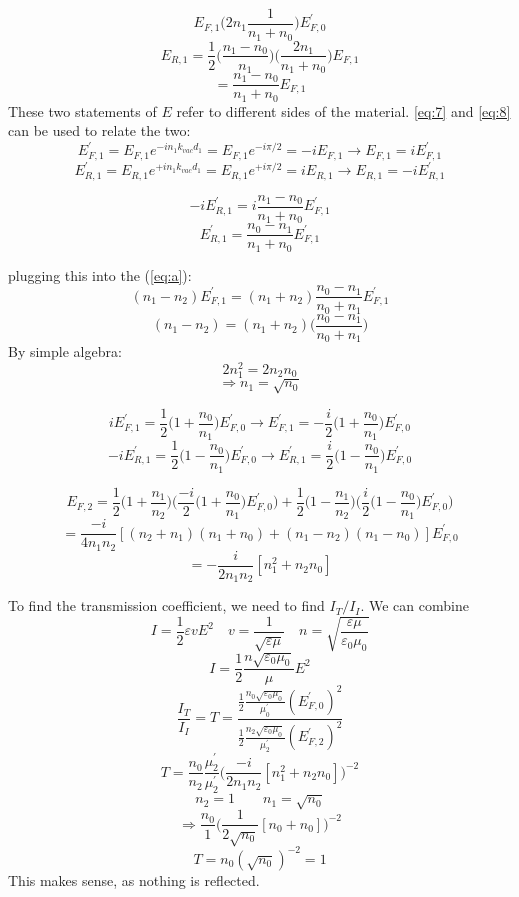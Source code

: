 \documentclass[12pt]{article}
\begin{document}
\begin{enumerate}[label=\alph*)]
\[E_{F,1}\Big(2n_1\frac{1}{n_1+n_0}\Big)E^\prime_{F,0}\]
\[E_{R,1} = \frac{1}{2}\Big(\frac{n_1-n_0}{n_1}\Big)\Big(\frac{2n_1}{n_1+n_0}\Big)E_{F,1}\]
\[= \frac{n_1-n_0}{n_1 +n_0}E_{F,1}\]
These two statements of $E$ refer to different sides of the material. \ref{eq:7} and \ref{eq:8} can be used to relate the two:
\begin{equation}
E^\prime_{F,1} = E_{F,1}e^{-in_1k_{vac}d_1} = E_{F,1}e^{-i\pi/2} = -iE_{F,1} \rightarrow E_{F,1} = i E^\prime_{F,1}
\label{eq:b}
\end{equation}
\begin{equation}
E^\prime_{R,1} = E_{R,1}e^{+in_1k_{vac}d_1} = E_{R,1}e^{+i\pi/2} = iE_{R,1} \rightarrow E_{R,1} = -i E^\prime_{R,1}
\label{eq:c}
\end{equation}
\smallskip

\[-iE^\prime_{R,1} = i \frac{n_1 - n_0}{n_1 + n_0}E^\prime_{F,1}\]
\[E^\prime_{R,1} = \frac{n_0 - n_1}{n_1 + n_0}E^\prime_{F,1}\]

plugging this into the (\ref{eq:a}):
\[(n_1-n_2)E^\prime_{F,1} = (n_1+n_2)\frac{n_0-n_1}{n_0 + n_1}E^\prime_{F,1}\]
\[(n_1 - n_2) = (n_1+n_2)\Big(\frac{n_0-n_1}{n_0+n_1}\Big)\]
By simple algebra:
\[2n_1^2 = 2n_2n_0\]
\[\Longrightarrow \boxed{n_1 = \sqrt{n_0}}\]

\[iE^\prime_{F,1} = \frac{1}{2}\Big(1 + \frac{n_0}{n_1}\Big)E^\prime_{F,0} \rightarrow E^\prime_{F,1} = -\frac{i}{2}\Big(1 + \frac{n_0}{n_1}\Big)E^\prime_{F,0}\]
\[-iE^\prime_{R,1} = \frac{1}{2}\Big(1-\frac{n_0}{n_1}\Big)E^\prime_{F,0} \rightarrow E^\prime_{R,1} = \frac{i}{2}\Big(1-\frac{n_0}{n_1}\Big)E^\prime_{F,0}\]

\[E_{F,2} = \frac{1}{2}\Big(1 + \frac{n_1}{n_2}\Big)\Big(\frac{-i}{2}\Big(1+\frac{n_0}{n_1}\Big)E^\prime_{F,0}\Big) + \frac{1}{2}\Big(1-\frac{n_1}{n_2}\Big)\Big(\frac{i}{2}\Big(1-\frac{n_0}{n_1}\Big)E^\prime_{F,0}\Big)\]
\[= \frac{-i}{4n_1n_2}[(n_2+n_1)(n_1+n_0)+(n_1-n_2)(n_1-n_0)]E^\prime_{F,0}\]
\[= -\frac{i}{2n_1n_2}[n_1^2 + n_2n_0]\]

To find the transmission coefficient, we need to find $I_T/I_I$. We can combine
\[I=\frac{1}{2}\varepsilon v E^2 \quad v= \frac{1}{\sqrt{\varepsilon \mu}} \quad n = \sqrt{\frac{\varepsilon \mu}{\varepsilon_0 \mu_0}}\]
\[I = \frac{1}{2}\frac{n \sqrt{\varepsilon_0 \mu_0}}{\mu}E^2\]\bigskip
\[\frac{I_T}{I_I}  = T = \frac{\frac{1}{2}\frac{n_0 \sqrt{\varepsilon_0 \mu_0}}{\mu^\prime_0}(E^\prime_{F,0})^2}{\frac{1}{2}\frac{n_2 \sqrt{\varepsilon_0 \mu_0}}{\mu^\prime_2}(E^\prime_{F,2})^2}\]
\[T = \frac{n_0}{n_2} \frac{\mu^\prime_2}{\mu^\prime_2}\Big(\frac{-i}{2n_1n_2}[n_1^2 + n_2n_0]\Big)^{-2}\]
\[n_2 = 1 \qquad n_1 = \sqrt{n_0}\]
\[\Rightarrow \frac{n_0}{1}\Big(\frac{1}{2\sqrt{n_0}}[n_0 + n_0]\Big)^{-2}\]
\[\boxed{T = n_0(\sqrt{n_0})^{-2} = 1}\]
This makes sense, as nothing is reflected. 



\end{enumerate}
\end{document}
